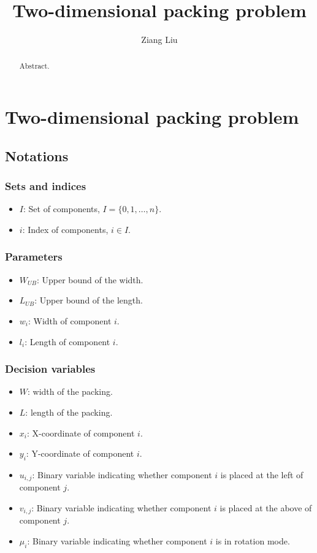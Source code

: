 \documentclass{article}
\title{Two-dimensional packing problem}
\author{Ziang Liu}
\begin{document}
\maketitle

\begin{abstract}
    Abstract.
\end{abstract}

\section{Two-dimensional packing problem}

\subsection*{Notations}

\subsubsection*{Sets and indices}
\begin{itemize}
    \item $I$: Set of components, $I = \{0, 1, \dots, n\}$.
    \item $i$: Index of components, $i \in I$.

\end{itemize}

\subsubsection*{Parameters}
\begin{itemize}
    \item $W_{UB}$: Upper bound of the width.
    \item $L_{UB}$: Upper bound of the length.
    \item $w_{i}$: Width of component $i$.
    \item $l_{i}$: Length of component $i$.
\end{itemize}

\subsubsection*{Decision variables}
\begin{itemize}
    \item $W$: width of the packing.
    \item $L$: length of the packing.
    \item $x_{i}$: X-coordinate of component $i$.
    \item $y_{i}$: Y-coordinate of component $i$.
    \item $u_{i, j}$: Binary variable indicating whether component $i$ is placed at the left of component $j$.
    \item $v_{i, j}$: Binary variable indicating whether component $i$ is placed at the above of component $j$.
    \item $\mu_{i}$: Binary variable indicating whether component $i$ is in rotation mode.
\end{itemize}
\end{document}
